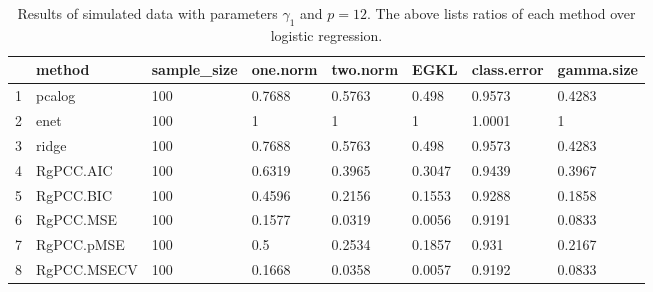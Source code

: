 \begin{table}[ht]
\centering
\begin{tabular}{rlllllll}
  \hline
 & method & sample\_size & one.norm & two.norm & EGKL & class.error & gamma.size \\ 
  \hline
1 & pcalog & 100 & 0.7688 & 0.5763 & 0.498 & 0.9573 & 0.4283 \\ 
  2 & enet & 100 & 1 & 1 & 1 & 1.0001 & 1 \\ 
  3 & ridge & 100 & 0.7688 & 0.5763 & 0.498 & 0.9573 & 0.4283 \\ 
  4 & RgPCC.AIC & 100 & 0.6319 & 0.3965 & 0.3047 & 0.9439 & 0.3967 \\ 
  5 & RgPCC.BIC & 100 & 0.4596 & 0.2156 & 0.1553 & 0.9288 & 0.1858 \\ 
  6 & RgPCC.MSE & 100 & 0.1577 & 0.0319 & 0.0056 & 0.9191 & 0.0833 \\ 
  7 & RgPCC.pMSE & 100 & 0.5 & 0.2534 & 0.1857 & 0.931 & 0.2167 \\ 
  8 & RgPCC.MSECV & 100 & 0.1668 & 0.0358 & 0.0057 & 0.9192 & 0.0833 \\ 
   \hline
\end{tabular}
\caption{Results of simulated data with parameters $\gamma_1$ and $p =12$. The above lists ratios of each method over logistic regression.} 
\label{fig-1-100-lead-new-algo-12-metrics-pratio}
\end{table}
